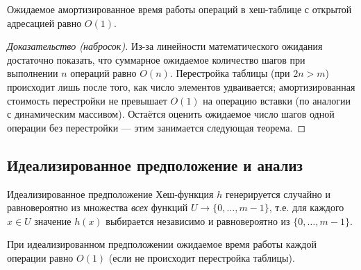 \begin{Statement}{}{}
	Ожидаемое амортизированное время работы операций в хеш-таблице с открытой адресацией равно $O(1)$.
\end{Statement}

\begin{proof}[Доказательство (набросок)]
	Из-за линейности математического ожидания достаточно показать, что суммарное ожидаемое количество шагов при выполнении $n$ операций равно $O(n)$. Перестройка таблицы (при $2n > m$) происходит лишь после того, как число элементов удваивается; амортизированная стоимость перестройки не превышает $O(1)$ на операцию вставки (по аналогии с динамическим массивом). Остаётся оценить ожидаемое число шагов одной операции без перестройки --- этим занимается следующая теорема.
\end{proof}

\subsection{Идеализированное предположение и анализ}

\begin{Definition}{Идеализированное предположение}{}
	Хеш-функция $h$ генерируется случайно и равновероятно из множества \emph{всех} функций $U \to \{0, \ldots, m-1\}$, т.е. для каждого $x \in U$ значение $h(x)$ выбирается независимо и равновероятно из $\{0, \ldots, m-1\}$.
\end{Definition}

\begin{Theorem}{}{}
	При идеализированном предположении ожидаемое время работы каждой операции равно $O(1)$ (если не происходит перестройка таблицы).
\end{Theorem}

